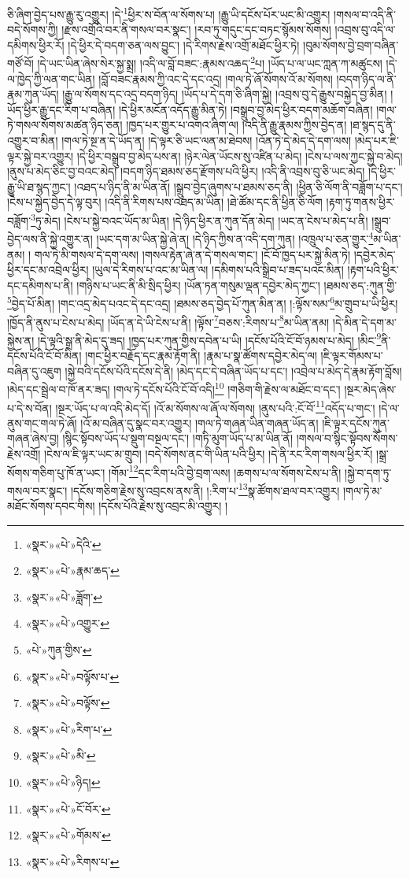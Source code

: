ཅི་ཞིག་བྱེད་པས་རྒྱུ་རུ་འགྱུར། །དེ་\footnote{«སྣར་»«པེ་»དེའི་}ཕྱིར་ས་བོན་ལ་སོགས་པ། །རྒྱུ་ཡི་དངོས་པོར་ཡང་མི་འགྱུར། །གསལ་བ་འདི་ནི་བདེ་སོགས་ཀྱི། །རྫས་འགྲོའི་བར་ནི་གསལ་བར་སྣང་། །རབ་ཏུ་གདུང་དང་བཏང་སྙོམས་སོགས། །འབྲས་བུ་འདི་ལ་དམིགས་ཕྱིར་རོ། །དེ་ཕྱིར་དེ་བདག་ཅན་ལས་བྱུང་། །དེ་རིགས་རྗེས་འགྲོ་མཐོང་ཕྱིར་ཏེ། །བུམ་སོགས་བྱེ་བྲག་བཞིན་གཙོ་བོ། །དེ་ཡང་ཡིན་ཞེས་སེར་སྐྱ་སྨྲ། །འདི་ལ་བློ་བཟང་:རྣམས་འཆད་\footnote{«སྣར་»«པེ་»རྣམ་ཆད་}པ། །ཡོད་པ་ལ་ཡང་ཀླན་ཀ་མཚུངས། །དེ་ལ་ཁྱེད་ཀྱི་ལན་གང་ཡིན། །བློ་བཟང་རྣམས་ཀྱི་འང་དེ་དང་འདྲ། །གལ་ཏེ་ཞོ་སོགས་འོ་མ་སོགས། །བདག་ཉིད་ལ་ནི་རྣམ་ཀུན་ཡོད། །རྒྱུ་ལ་སོགས་དང་འདྲ་བདག་ཉིད། །ཡོད་པ་དེ་དག་ཅི་ཞིག་སྐྱེ། །འབྲས་བུ་དེ་རྒྱུས་བསྐྱེད་བྱ་མིན། །ཡོད་ཕྱིར་རྒྱུ་དང་རིག་པ་བཞིན། །དེ་ཕྱིར་མངོན་འདོད་རྒྱུ་མིན་ཏེ། །བསྒྲུབ་བྱ་མེད་ཕྱིར་བདག་མཆོག་བཞིན། །གལ་ཏེ་གསལ་སོགས་མཚན་ཉིད་ཅན། །ཁྱད་པར་གྱུར་པ་འགའ་ཞིག་ལ། །འདི་ནི་རྒྱུ་རྣམས་ཀྱིས་བྱེད་ན། །ཐ་སྙད་དུ་ནི་འགྱུར་བ་མིན། །གལ་ཏེ་སྔ་ན་དེ་ཡོད་ན། །དེ་ལྟར་ཅི་ཡང་ལན་མ་ཐེབས། །འོན་ཏེ་དེ་མེད་དེ་དག་ལས། །མེད་པར་ཇི་ལྟར་སྐྱེ་བར་འགྱུར། །དེ་ཕྱིར་བསྒྲུབ་བྱ་མེད་པས་ན། །ཉེར་ལེན་ཡོངས་སུ་འཛིན་པ་མེད། །ངེས་པ་ལས་ཀྱང་སྐྱེ་བ་མེད། །ནུས་པ་མེད་ཅིང་བྱ་བའང་མེད། །བདག་ཉིད་ཐམས་ཅད་རྫོགས་པའི་ཕྱིར། །འདི་ནི་འབྲས་བུ་ཅི་ཡང་མེད། །དེ་ཕྱིར་རྒྱུ་ཡི་ཐ་སྙད་ཀྱང་། །འཐད་པ་ཉིད་ནི་མ་ཡིན་ནོ། །སྒྲུབ་བྱེད་ཞུགས་པ་ཐམས་ཅད་ནི། །ཕྱིན་ཅི་ལོག་ནི་བཟློག་པ་དང་། །ངེས་པ་སྐྱེད་བྱེད་དེ་ལྟ་བུར། །འདི་ནི་རིགས་པས་འཐད་མ་ཡིན། །ཐེ་ཚོམ་དང་ནི་ཕྱིན་ཅི་ལོག །རྟག་ཏུ་གནས་ཕྱིར་བཟློག་\footnote{«སྣར་»«པེ་»ཟློག་}ཏུ་མེད། །ངེས་པ་སྐྱེ་བའང་ཡོད་མ་ཡིན། །དེ་ཉིད་ཕྱིར་ན་ཀུན་དོན་མེད། །ཡང་ན་ངེས་པ་མེད་པ་ནི། །སྒྲུབ་བྱེད་ལས་ནི་སྐྱེ་འགྱུར་ན། །ཡང་དག་མ་ཡིན་སྐྱེ་ཞེ་ན། །དེ་ཉིད་ཀྱིས་ན་འདི་དག་ཀུན། །འཁྲུལ་པ་ཅན་གྱུར་\footnote{«སྣར་»«པེ་»འགྱུར་}མ་ཡིན་ནམ། །
གལ་ཏེ་མི་གསལ་དེ་དག་ལས། །གསལ་རྟེན་ཞེ་ན་དེ་གསལ་གང་། །ངོ་བོ་ཁྱད་པར་སྐྱེ་མིན་ཏེ། །དབྱེར་མེད་ཕྱིར་དང་མ་འབྲེལ་ཕྱིར། །ཡུལ་དེ་རིགས་པ་འང་མ་ཡིན་ལ། །དམིགས་པའི་སྒྲིབ་པ་ཟད་པའང་མིན། །རྟག་པའི་ཕྱིར་དང་དམིགས་པ་ནི། །གཉིས་པ་ཡང་ནི་མི་སྲིད་ཕྱིར། །ཡོན་ཏན་གསུམ་ལྡན་དབྱེར་མེད་ཀྱང་། །ཐམས་ཅད་:ཀུན་གྱི་\footnote{«པེ་»ཀུན་གྱིས་}བྱེད་པོ་མིན། །གང་འདྲ་མེད་པའང་དེ་དང་འདྲ། །ཐམས་ཅད་བྱེད་པོ་ཀུན་མིན་ན། །:ལྟོས་སམ་\footnote{«སྣར་»«པེ་»བལྟོས་པ་}མ་གྲུབ་པ་ཡི་ཕྱིར། །ཁྱོད་ནི་ནུས་པ་ངེས་པ་མེད། །ཡོད་ན་དེ་ཡི་ངེས་པ་ནི། །ལྟོས་\footnote{«སྣར་»«པེ་»བལྟོས་}བཅས་:རིགས་པ་\footnote{«སྣར་»«པེ་»རིག་པ་}མ་ཡིན་ནམ། །དེ་མིན་དེ་དག་མ་སྐྱེས་ན། །དེ་ལྟའི་སྒྲ་ནི་མེད་དུ་ཟད། །ཁྱད་པར་ཀུན་གྱིས་དབེན་པ་ཡི། །དངོས་པོའི་ངོ་བོ་ཉམས་པ་མེད། །མིང་\footnote{«སྣར་»«པེ་»མི་}ནི་དངོས་པོའི་ངོ་བོ་མིན། །གང་ཕྱིར་བརྗོད་དང་རྣམ་རྟོག་ནི། །རྣམ་པ་སྣ་ཚོགས་དབྱེར་མེད་ལ། །ཇི་ལྟར་གོམས་པ་བཞིན་དུ་འཇུག །སྐྱེ་བའི་དངོས་པོའི་དངོས་དེ་ནི། །མེད་དང་དེ་བཞིན་ཡོད་པ་དང་། །འབྲེལ་པ་མེད་དེ་རྣམ་རྟོག་བློས། །མེད་དང་སྦྲེལ་བ་ཁོ་ནར་ཟད། །གལ་ཏེ་དངོས་པོའི་ངོ་བོ་འདི།\footnote{«སྣར་»«པེ་»ཉིད།} །གཅིག་གི་རྗེས་ལ་མཐོང་བ་དང་། །སྔར་མེད་ཞེས་པ་དེ་ས་བོན། །སྔར་ཡོད་པ་ལ་འདི་མེད་དོ། །འོ་མ་སོགས་ལ་ཞོ་ལ་སོགས། །ནུས་པའི་:ངོ་བོ་\footnote{«སྣར་»«པེ་»ངོ་བོར་}འདོད་པ་གང་། །དེ་ལ་ནུས་གང་གལ་ཏེ་ཞོ། །འོ་མ་བཞིན་དུ་སྣང་བར་འགྱུར། །གལ་ཏེ་གཞན་ཡིན་གཞན་ཡོད་ན། །ཇི་ལྟར་དངོས་ཀུན་གཞན་ཞེས་བྱ། །སྙིང་སྟོབས་ཡོད་པ་སྡུག་བསྔལ་དང་། །གཏི་མུག་ཡོད་པ་མ་ཡིན་ནོ། །གསལ་བ་སྙིང་སྟོབས་སོགས་རྗེས་འགྲོ། །ངེས་ལ་ཇི་ལྟར་ཡང་མ་གྲུབ། །བདེ་སོགས་ནང་གི་ཡིན་པའི་ཕྱིར། །དེ་ནི་རང་རིག་གསལ་ཕྱིར་རོ། །སྒྲ་སོགས་གཅིག་པུ་ཁོ་ན་ཡང་། །གོམ་\footnote{«སྣར་»«པེ་»གོམས་}དང་རིག་པའི་བྱེ་བྲག་ལས། །ཆགས་པ་ལ་སོགས་ངེས་པ་ནི། །སྐྱེ་བ་དག་ཏུ་གསལ་བར་སྣང་། །དངོས་གཅིག་རྗེས་སུ་འབྲངས་ནས་ནི། །:རིག་པ་\footnote{«སྣར་»«པེ་»རིགས་པ་}སྣ་ཚོགས་ཐལ་བར་འགྱུར། །གལ་ཏེ་མ་མཐོང་སོགས་དབང་གིས། །དངོས་པོའི་རྗེས་སུ་འབྲང་མི་འགྱུར། །
